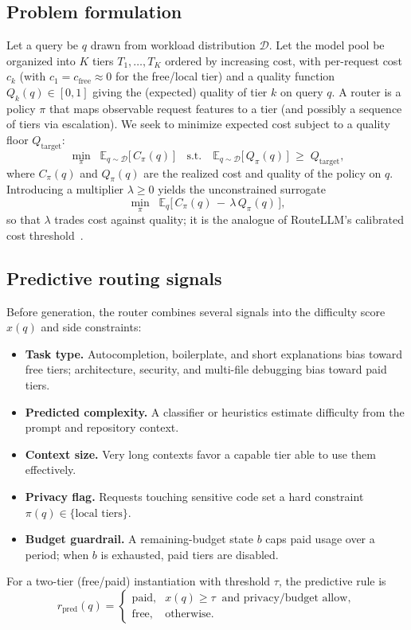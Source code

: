 \documentclass[11pt]{article}
\newcommand{\cfree}{c_{\mathrm{free}}}
\newcommand{\Qt}{Q_{\mathrm{target}}}
\begin{document}
\subsection{Problem formulation}
Let a query be $q$ drawn from workload distribution $\mathcal{D}$. Let the model
pool be organized into $K$ tiers $T_1,\dots,T_K$ ordered by increasing cost,
with per-request cost $c_k$ (with $c_1=\cfree\approx 0$ for the free/local tier)
and a quality function $Q_k(q)\in[0,1]$ giving the (expected) quality of tier
$k$ on query $q$. A router is a policy $\pi$ that maps observable request
features to a tier (and possibly a sequence of tiers via escalation). We seek to
minimize expected cost subject to a quality floor $\Qt$:
\begin{equation}
\min_{\pi}\;\; \mathbb{E}_{q\sim\mathcal{D}}\big[\,C_\pi(q)\,\big]
\quad\text{s.t.}\quad
\mathbb{E}_{q\sim\mathcal{D}}\big[\,Q_\pi(q)\,\big]\;\ge\;\Qt ,
\label{eq:opt}
\end{equation}
where $C_\pi(q)$ and $Q_\pi(q)$ are the realized cost and quality of the policy
on $q$. Introducing a multiplier $\lambda\ge0$ yields the unconstrained
surrogate
\begin{equation}
\min_{\pi}\;\;\mathbb{E}_{q}\big[\,C_\pi(q)\,-\,\lambda\,Q_\pi(q)\,\big],
\label{eq:lagrangian}
\end{equation}
so that $\lambda$ trades cost against quality; it is the analogue of RouteLLM's
calibrated cost threshold~\cite{routellm}.

\subsection{Predictive routing signals}
Before generation, the router combines several signals into the difficulty
score $x(q)$ and side constraints:
\begin{itemize}
  \item \textbf{Task type.} Autocompletion, boilerplate, and short explanations
        bias toward free tiers; architecture, security, and multi-file
        debugging bias toward paid tiers.
  \item \textbf{Predicted complexity.} A classifier or heuristics estimate
        difficulty from the prompt and repository context.
  \item \textbf{Context size.} Very long contexts favor a capable tier able to
        use them effectively.
  \item \textbf{Privacy flag.} Requests touching sensitive code set a hard
        constraint $\pi(q)\in\{\text{local tiers}\}$.
  \item \textbf{Budget guardrail.} A remaining-budget state $b$ caps paid usage
        over a period; when $b$ is exhausted, paid tiers are disabled.
\end{itemize}
For a two-tier (free/paid) instantiation with threshold $\tau$, the predictive
rule is
\begin{equation}
r_{\mathrm{pred}}(q)=
\begin{cases}
\text{paid}, & x(q)\ge\tau \ \text{ and privacy/budget allow},\\
\text{free}, & \text{otherwise.}
\end{cases}
\label{eq:predrule}
\end{equation}
\end{document}
